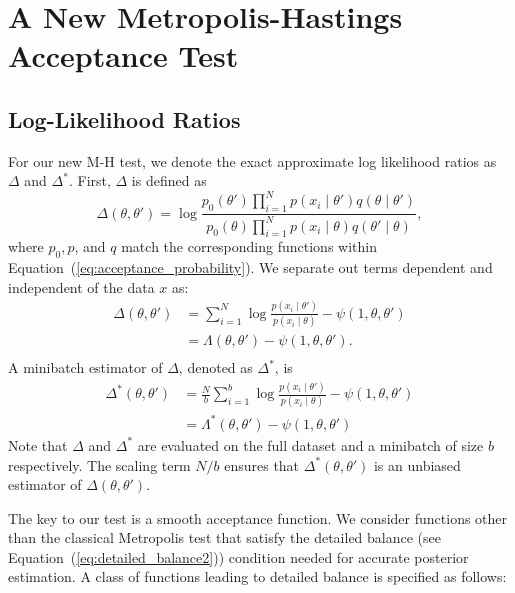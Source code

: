 \documentclass[twoside]{article} \usepackage{aistats2017}
\begin{document}
\section{A New Metropolis-Hastings Acceptance Test}\label{sec:our_algorithm}

\subsection{Log-Likelihood Ratios}\label{ssec:log_likelihood_ratios}

For our new M-H test, we denote the exact approximate log likelihood ratios
as $\Delta$ and $\Delta^*$.  First, $\Delta$ is defined as
\begin{equation}\label{eq:delta1}
    \Delta(\theta,\theta')  =
    \log \frac{p_0(\theta')\prod_{i=1}^N p(x_i \mid \theta')q(\theta \mid
    \theta')}{p_0(\theta)\prod_{i=1}^N p(x_i \mid \theta)q(\theta' \mid\theta)},
\end{equation}
where $p_0, p$, and $q$ match the corresponding functions within
Equation~(\ref{eq:acceptance_probability}). We separate out terms dependent and
independent of the data $x$ as:
\begin{equation}\label{eq:delta2}
\begin{split}
    \Delta(\theta,\theta') &= \sum_{i=1}^N\log\frac{p(x_i\mid\theta')}{p(x_i\mid\theta)} - \psi(1,\theta,\theta') \\
    & = \Lambda(\theta,\theta') - \psi(1,\theta,\theta'). \\
\end{split}
\end{equation}
A minibatch estimator of $\Delta$, denoted as $\Delta^*$, is
\begin{equation}\label{eq:delta3}
\begin{split}
    \Delta^*(\theta,\theta') &=
\frac{N}{b}\sum_{i=1}^b\log\frac{p(x_i\mid\theta')}{p(x_i\mid\theta)} - \psi(1,\theta,\theta')\\
&=\Lambda^*(\theta,\theta') - \psi(1,\theta,\theta')
\end{split}
\end{equation}
Note that $\Delta$ and $\Delta^*$ are evaluated on the full dataset and a
minibatch of size $b$ respectively. The scaling term $N/b$ ensures that
$\Delta^*(\theta,\theta')$ is an unbiased estimator of $\Delta(\theta,\theta')$.

The key to our test is a smooth acceptance function.  We consider functions
other than the classical Metropolis test that satisfy the detailed balance (see
Equation~(\ref{eq:detailed_balance2})) condition needed for accurate posterior
estimation. A class of functions leading to detailed balance is specified as
follows:
\end{document}
